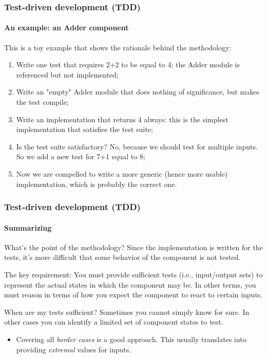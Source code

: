 \begin{frame}
\frametitle{Test-driven development (TDD)}
\framesubtitle{An example: an Adder component}

This is a toy example that shows the rationale behind the methodology:
\begin{enumerate}
\item Write one test that requires 2+2 to be equal to 4; the Adder module is referenced but not implemented;
\pause
\item Write an "empty" Adder module that does nothing of significance, but makes the test compile;
\pause
\item Write an implementation that returns 4 always: this is the simplest implementation that satisfies the test suite;
\pause
\item Is the test suite satisfactory? No, because we should test for multiple inputs. So we add a new test for 7+1 equal to 8;
\pause
\item Now we are compelled to write a more generic (hence more usable) implementation, which is probably the correct one.
\end{enumerate}

\end{frame}

\begin{frame}
\frametitle{Test-driven development (TDD)}
\framesubtitle{Summarizing}

\begin{block}{What's the point of the methodology?}
Since the implementation is written for the tests, it's more difficult that some behavior of the component is not tested.
\end{block}
\pause
\begin{block}{The key requirement:}
You must provide sufficient tests (i.e., input/output sets) to represent the actual states in which the component may be. In other terms, you must reason in terms of how you expect the component to react to certain inputs.
\end{block}
\pause
\begin{block}{When are my tests sufficient?}
Sometimes you cannot simply know for sure. In other cases you can identify a limited set of component states to test.
\begin{itemize}
\item Covering all {\em border cases} is a good approach. This usually translates into providing {\em extremal} values for inputs.
\end{itemize}
\end{block}
\end{frame}